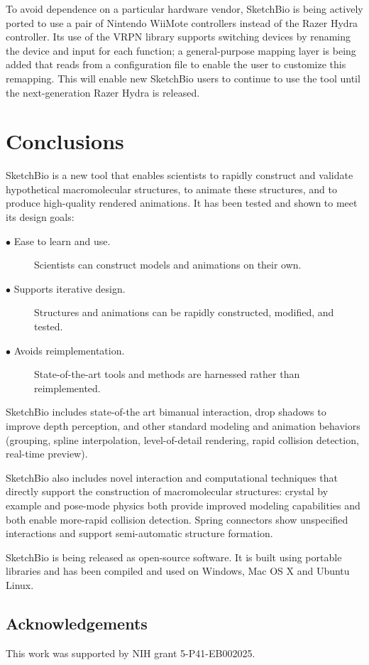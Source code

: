 \documentclass[twocolumn]{bmcart}%
\begin{document}
To avoid dependence on a particular hardware vendor, SketchBio is being actively ported to use a pair of Nintendo WiiMote controllers instead of the Razer Hydra controller.  Its use of the VRPN library supports switching devices by renaming the device and input for each function; a general-purpose mapping layer is being added that reads from a configuration file to enable the user to customize this remapping.  This will enable new SketchBio users to continue to use the tool until the next-generation Razer Hydra is released.

\section*{Conclusions}
SketchBio is a new tool that enables scientists to rapidly construct and validate hypothetical macromolecular structures, to animate these structures, and to produce high-quality rendered animations.  It has been tested and shown to meet its design goals:
\begin{description}
  \item[$\bullet$ Ease to learn and use.] Scientists can construct models and animations on their own.
  \item[$\bullet$ Supports iterative design.] Structures and animations can be rapidly constructed, modified, and tested.
  \item[$\bullet$ Avoids reimplementation.] State-of-the-art tools and methods are harnessed rather than reimplemented.
\end{description}

SketchBio includes state-of-the art bimanual interaction, drop shadows to improve depth perception, and other standard modeling and animation behaviors (grouping, spline interpolation, level-of-detail rendering, rapid collision detection, real-time preview).

SketchBio also includes novel interaction and computational techniques that directly support the construction of macromolecular structures: crystal by example and pose-mode physics both provide improved modeling capabilities and both enable more-rapid collision detection.  Spring connectors show unspecified interactions and support semi-automatic structure formation.

SketchBio is being released as open-source software.  It is built using portable libraries and has been compiled and used on Windows, Mac OS X and Ubuntu Linux.

\subsection*{Acknowledgements}
This work was supported by NIH grant 5-P41-EB002025.
\end{document}
